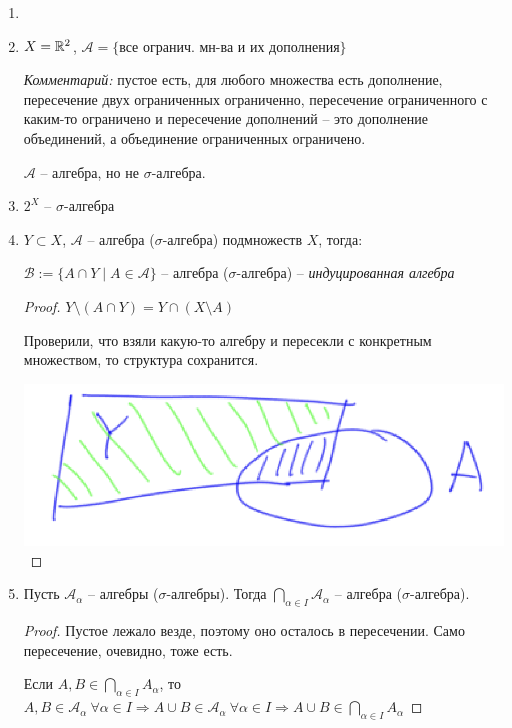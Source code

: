 \begin{example} 
    \begin{enumerate}
        \item[]
        \item $X=\mathbb{R}^2$, $\mathcal{A} = \{\text{все огранич. мн-ва и их дополнения}\}$
        
        \textit{Комментарий:} пустое есть, для любого множества есть дополнение, пересечение двух ограниченных ограниченно,
        пересечение ограниченного с каким-то ограничено и пересечение дополнений – это дополнение объединений, а 
        объединение ограниченных ограничено.
        
        $\mathcal{A}$ – алгебра, но не $\sigma$-алгебра.

        \item $2^X$ – $\sigma$-алгебра
        
        \item $Y\subset X$, $\mathcal{A}$ – алгебра ($\sigma$-алгебра) подмножеств $X$, тогда:
        
        $\mathcal{B} := \{ A\cap Y \mid A\in \mathcal{A}\}$ – алгебра ($\sigma$-алгебра) – \textit{индуцированная алгебра}

        \begin{proof}
            $Y \setminus (A\cap Y) = Y \cap (X \setminus A)$

            Проверили, что взяли какую-то алгебру и пересекли с конкретным множеством, то структура сохранится.

            \includegraphics[width=0.3\linewidth]{images/23-09-07-1.png}
        \end{proof}

        \item Пусть $\mathcal{A}_\alpha$ – алгебры ($\sigma$-алгебры). Тогда $\bigcap\limits_{\alpha \in I} \mathcal{A}_\alpha$ – алгебра ($\sigma$-алгебра).
        
        \begin{proof}
            Пустое лежало везде, поэтому оно осталось в пересечении. Само пересечение, очевидно, тоже есть.

            Если $A, B\in \bigcap\limits_{\alpha \in I} A_\alpha$, то $A, B\in \mathcal{A}_\alpha\ \forall \alpha \in I\Rightarrow A\cup B 
            \in \mathcal{A}_\alpha\ \forall \alpha \in I\Rightarrow A\cup B\in \bigcap\limits_{\alpha \in I} A_\alpha$
        \end{proof}


\end{enumerate}
\end{example}
